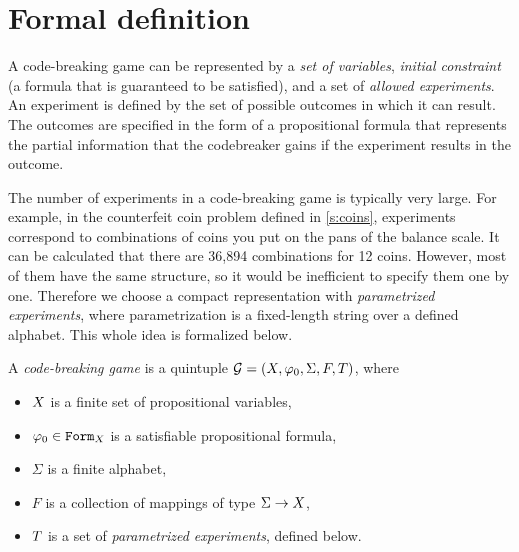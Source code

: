 
\section{Formal definition}

A code-breaking game can be represented by a \emph{set of variables},
  \emph{initial constraint} (a formula that is guaranteed to be satisfied),
  and a set of \emph{allowed experiments}.
An experiment is defined by the set of possible outcomes in which it can result.
The outcomes are specified in the form of a propositional formula that
  represents the partial information
  that the codebreaker gains if the experiment results in the outcome.

The number of experiments in a code-breaking game is typically very large.
For example, in the counterfeit coin problem defined in \autoref{s:coins},
  experiments correspond to combinations of coins you put on the pans of the
  balance scale.
It can be calculated that there are 36,894 combinations for 12 coins.
However, most of them have the same structure,
  so it would be inefficient to specify them one by one.
Therefore we choose a compact representation with \emph{parametrized experiments},
  where parametrization is a fixed-length string over a defined alphabet.
This whole idea is formalized below.

\begin{definition} \label{def:game}
A \emph{code-breaking game} is a quintuple
  $\mathcal{G} = (X, \varphi_0, \Sigma, F, T)$, where
  \begin{itemize}
  \item $X$ is a finite set of propositional variables,
  \item $\varphi_0 \in \mathtt{Form}_X$ is a satisfiable propositional formula,
  \item $\Sigma$ is a finite alphabet,
  \item $F$ is a collection of mappings of type $\Sigma -> X$,
  \item $T$ is a set of \emph{parametrized experiments}, defined below.
  \end{itemize}
\end{definition}

